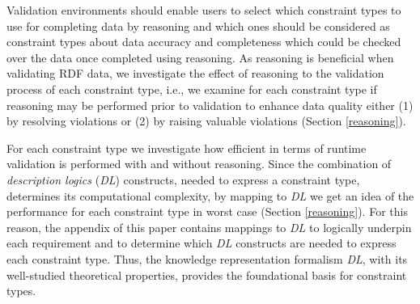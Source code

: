 \documentclass{acm_proc_article-sp}
\newcommand{\ms}[1]{%
  \texttt{#1}
}
\begin{document}
Validation environments should enable users to select which constraint types to use for completing data by reasoning 
and which ones should be considered as constraint types about data accuracy and completeness which could be checked over the data once completed using reasoning.
As reasoning is beneficial when validating RDF data, 
we investigate the effect of reasoning to the validation process of each constraint type, i.e.,
we examine for each constraint type if reasoning may be performed prior to validation to enhance data quality
either (1) by resolving violations or (2) by raising valuable violations (Section \ref{reasoning}).

For each constraint type we investigate how efficient in terms of runtime validation is performed with and without reasoning.
Since the combination of \emph{description logics} (\emph{DL}) constructs, needed to express a constraint type, determines its computational complexity, 
by mapping to \emph{DL} we get an idea of the performance for each constraint type in worst case (Section \ref{reasoning}).
For this reason, the appendix of this paper contains mappings to \emph{DL} to logically underpin each requirement and to determine which \emph{DL} constructs are needed to express each constraint type.
Thus, the knowledge representation formalism \emph{DL}, with its well-studied theoretical properties, 
provides the foundational basis for constraint types. 
\end{document}

